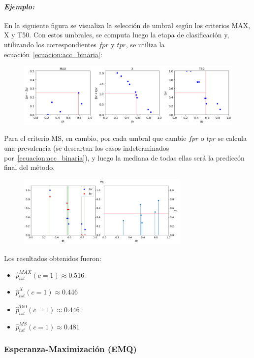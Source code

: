 \paragraph{\it Ejemplo:\/} En la siguiente figura se visualiza la selección de
umbral según los criterios MAX, X y T50. Con estos umbrales, se computa luego la
etapa de clasificación y, utilizando los correspondientes \(fpr\) y \(tpr\), se
utiliza la ecuación~\ref{ecuacion:acc_binaria}:
\begin{figure}[H]
    \includegraphics[width=\textwidth]{../plots_teoria/seleccion_umbrales_max_x_t50.png}
    \caption{}\label{fig:seleccion_umbrales_max_x_t50}
\end{figure}
Para el criterio MS, en cambio, por cada umbral que cambie \(fpr\) o \(tpr\) se
calcula una prevalencia (se descartan los casos indeterminados
por~\ref{ecuacion:acc_binaria}), y luego la mediana de todas ellas será la
prediccón final del método.
\begin{figure}[H]
    \centerline{\includegraphics[width=0.75\textwidth]{../plots_teoria/seleccion_umbrales_ms.png}}
    \caption{}\label{fig:seleccion_umbrales_ms}
\end{figure}
Los resultados obtenidos fueron:
\begin{itemize}
    \item \(\hat p^{MAX}_{tst}(c=1) \approx  0.516\)
    \item \(\hat p^{X}_{tst}(c=1) \approx  0.446\)
    \item \(\hat p^{T50}_{tst}(c=1) \approx  0.446\)
    \item \(\hat p^{MS}_{tst}(c=1) \approx  0.481\)
\end{itemize}

\subsubsection{Esperanza-Maximización (EMQ)}\label{estimacion:emq}

